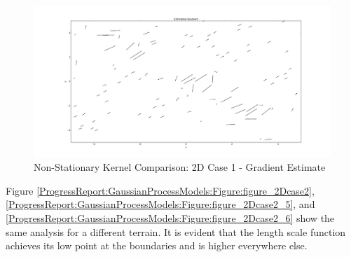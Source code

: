 				\begin{figure}[!htbp]
					\centering
						\includegraphics[width=\textwidth]{Figures/Progress/figure_2Dcase1_6.png}
					\caption{Non-Stationary Kernel Comparison: 2D Case 1 - Gradient Estimate}
					\label{ProgressReport:GaussianProcessModels:Figure:figure_2Dcase1_6}
				\end{figure}
							
				\FloatBarrier
				
				Figure \ref{ProgressReport:GaussianProcessModels:Figure:figure_2Dcase2}, \ref{ProgressReport:GaussianProcessModels:Figure:figure_2Dcase2_5}, and \ref{ProgressReport:GaussianProcessModels:Figure:figure_2Dcase2_6} show the same analysis for a different terrain. It is evident that the length scale function achieves its low point at the boundaries and is higher everywhere else.
				
